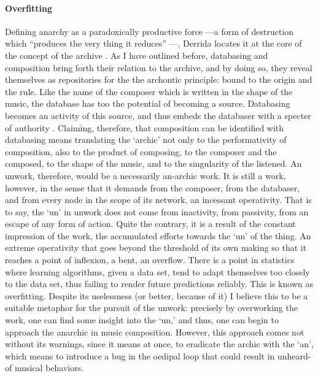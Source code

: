 \paragraph{Overfitting}
Defining anarchy as a paradoxically productive force ---a form of destruction which ``produces the very thing it reduces'' \parencite{Der95:Arc}---, Derrida locates it at the core of the concept of the archive . As I have outlined before, databasing and composition bring forth their relation to the archive, and by doing so, they reveal themselves as repositories for the the archontic principle: bound to the origin and the rule. Like the name of the composer which is written in the shape of the music, the database has too the potential of becoming a source. Databasing becomes an activity of this source, and thus embeds the databaser with a specter of authority . Claiming, therefore, that composition can be identified with databasing means translating the `archic' not only to the performativity of composition, also to the product of composing, to the composer and the composed, to the shape of the music, and to the singularity of the listened. An unwork, therefore, would be a necessarily an-archic work. It is still a work, however, in the sense that it demands from the composer, from the databaser, and from every node in the scope of its network, an incessant operativity. That is to say, the `un' in unwork does not come from inactivity, from passivity, from an escape of any form of action. Quite the contrary, it is a result of the constant impression of the work, the accumulated efforts towards the `un' of the thing. An extreme operativity that goes beyond the threshold of its own making so that it reaches a point of inflexion, a bent, an overflow. There is a point in statistics where learning algorithms, given a data set, tend to adapt themselves too closely to the data set, thus failing to render future predictions reliably. This is known as overfitting. Despite its uselessness (or better, because of it) I believe this to be a suitable metaphor for the pursuit of the unwork: precisely by overworking the work, one can find some insight into the `un,' and thus, one can begin to approach the anarchic in music composition. However, this approach comes not without its warnings, since it means at once, to eradicate the archic with the `an', which means to introduce a bug in the oedipal loop that could result in unheard-of musical behaviors.
